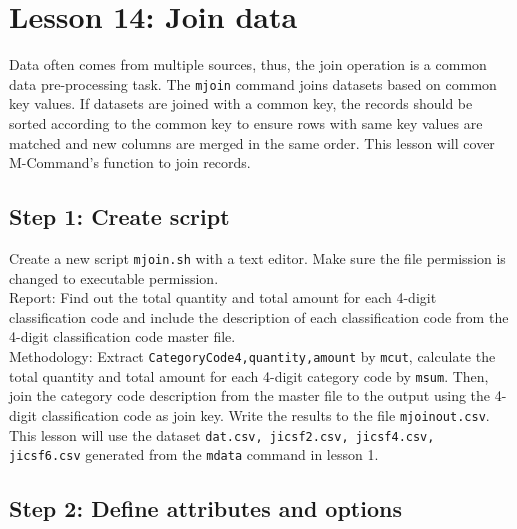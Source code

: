 

%


\section{Lesson 14: Join data}

Data often comes from multiple sources, thus, the join operation is a common data pre-processing task. The \verb|mjoin| command joins datasets based on common key values. If datasets are joined with a common key, the records should be sorted according to the common key to ensure rows with same key values are matched and new columns are merged in the same order.  This lesson will cover M-Command's function to join records. 

\subsection{Step 1: Create script}

Create a new script \verb|mjoin.sh| with a text editor. Make sure the file permission is changed to executable permission. \\

Report:  Find out the total quantity and total amount for each 4-digit classification code and include the description of each classification code from the 4-digit classification code master file.    \\ 

Methodology: Extract \verb|CategoryCode4,quantity,amount| by \verb|mcut|, calculate the total quantity and total amount for each 4-digit category code by \verb|msum|. Then, join the category code description from the master file to the output using the 4-digit classification code as join key. Write the results to the file \verb|mjoinout.csv|.\\

This lesson will use the dataset \verb|dat.csv, jicsf2.csv, jicsf4.csv, jicsf6.csv| generated from the \verb|mdata| command in lesson 1. 

 \subsection{Step 2: Define attributes and options }

